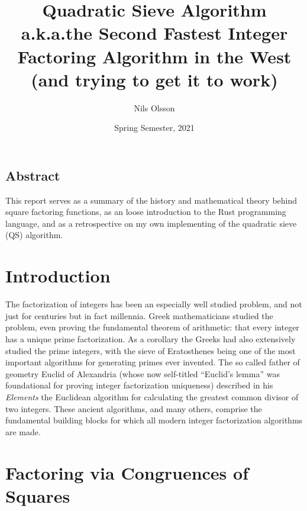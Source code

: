 \documentclass{report}
\begin{document}
\title{%
    Quadratic Sieve Algorithm \\[1em]
    {\large%
        a.k.a.\@ the Second Fastest Integer Factoring Algorithm in the West \\
        (and trying to get it to work)
    }
}
\author{Nils Olsson}
\date{Spring Semester, 2021}
\maketitle

{
    \hypersetup{linkcolor=.}
    \tableofcontents
}


\pagebreak

\begingroup
\let\clearpage\relax
\section*{Abstract}

This report serves as a summary of the history and mathematical theory behind
square factoring functions, as an loose introduction to the Rust programming
language, and as a retrospective on my own implementing of the quadratic sieve
(QS) algorithm.

\chapter{Introduction}

The factorization of integers has been an especially well studied problem,
and not just for centuries but in fact millennia.
Greek mathematicians studied the problem, even proving the fundamental theorem
of arithmetic: that every integer has a unique prime factorization.
As a corollary the Greeks had also extensively studied the prime integers,
with the sieve of Eratosthenes being one of the most important algorithms
for generating primes ever invented.
The so called father of geometry Euclid of Alexandria (whose now self-titled
``Euclid's lemma'' was foundational for proving integer factorization
uniqueness) described in his \emph{Elements} the Euclidean algorithm for
calculating the greatest common divisor of two integers.
These ancient algorithms, and many others, comprise the fundamental building
blocks for which all modern integer factorization algorithms are made.

\endgroup

\chapter{Factoring via Congruences of Squares}
\end{document}
